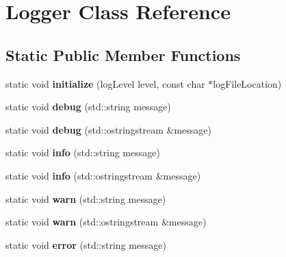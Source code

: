 \hypertarget{classLogger}{
\section{\-Logger \-Class \-Reference}
\label{classLogger}
}
\subsection*{\-Static \-Public \-Member \-Functions}
\begin{DoxyCompactItemize}
\item 
\hypertarget{classLogger_a350a1f95debbed53f733dbe470da46db}{
static void {\bfseries initialize} (log\-Level level, const char $\ast$log\-File\-Location)}
\label{classLogger_a350a1f95debbed53f733dbe470da46db}

\item 
\hypertarget{classLogger_a49c409b258945c25b9bef8b1d1d8ced7}{
static void {\bfseries debug} (std\-::string message)}
\label{classLogger_a49c409b258945c25b9bef8b1d1d8ced7}

\item 
\hypertarget{classLogger_a1dbeeae2a8293966cbb69c9f416cb48b}{
static void {\bfseries debug} (std\-::ostringstream \&message)}
\label{classLogger_a1dbeeae2a8293966cbb69c9f416cb48b}

\item 
\hypertarget{classLogger_ae14f5d9d3092f9a3c40d1dc8f7d2ca7a}{
static void {\bfseries info} (std\-::string message)}
\label{classLogger_ae14f5d9d3092f9a3c40d1dc8f7d2ca7a}

\item 
\hypertarget{classLogger_a00872f9d854d6da34c70288930d74ee0}{
static void {\bfseries info} (std\-::ostringstream \&message)}
\label{classLogger_a00872f9d854d6da34c70288930d74ee0}

\item 
\hypertarget{classLogger_adfa9532f8fbb7b8bd558f15f73166c78}{
static void {\bfseries warn} (std\-::string message)}
\label{classLogger_adfa9532f8fbb7b8bd558f15f73166c78}

\item 
\hypertarget{classLogger_a88571fd8a113fa4552df0921625716e5}{
static void {\bfseries warn} (std\-::ostringstream \&message)}
\label{classLogger_a88571fd8a113fa4552df0921625716e5}

\item 
\hypertarget{classLogger_adfb307fbef0a8016664a052530aa65c8}{
static void {\bfseries error} (std\-::string message)}
\label{classLogger_adfb307fbef0a8016664a052530aa65c8}


\end{DoxyCompactItemize}
